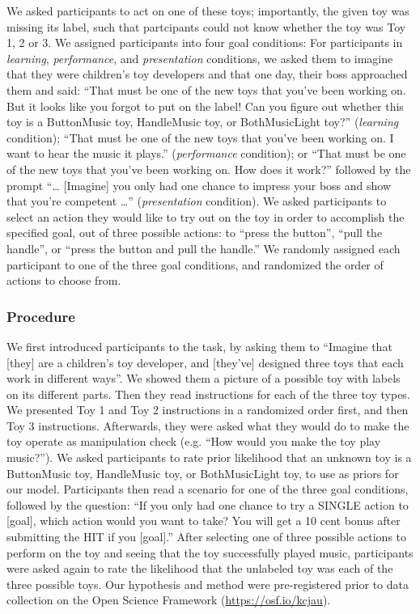 \documentclass[10pt, letterpaper]{article}
\begin{document}
We asked participants to act on one of these toys; importantly, the
given toy was missing its label, such that partcipants could not know
whether the toy was Toy 1, 2 or 3. We assigned participants into four
goal conditions: For participants in \emph{learning},
\emph{performance}, and \emph{presentation} conditions, we asked them to
imagine that they were children's toy developers and that one day, their
boss approached them and said: ``That must be one of the new toys that
you've been working on. But it looks like you forgot to put on the
label! Can you figure out whether this toy is a ButtonMusic toy,
HandleMusic toy, or BothMusicLight toy?'' (\emph{learning} condition);
``That must be one of the new toys that you've been working on. I want
to hear the music it plays.'' (\emph{performance} condition); or ``That
must be one of the new toys that you've been working on. How does it
work?'' followed by the prompt ``\ldots{} {[}Imagine{]} you only had one
chance to impress your boss and show that you're competent \ldots{}''
(\emph{presentation} condition). We asked participants to select an
action they would like to try out on the toy in order to accomplish the
specified goal, out of three possible actions: to ``press the button'',
``pull the handle'', or ``press the button and pull the handle.'' We
randomly assigned each participant to one of the three goal conditions,
and randomized the order of actions to choose from.

\subsubsection{Procedure}\label{procedure}

We first introduced participants to the task, by asking them to
``Imagine that {[}they{]} are a children's toy developer, and
{[}they've{]} designed three toys that each work in different ways''. We
showed them a picture of a possible toy with labels on its different
parts. Then they read instructions for each of the three toy types. We
presented Toy 1 and Toy 2 instructions in a randomized order first, and
then Toy 3 instructions. Afterwards, they were asked what they would do
to make the toy operate as manipulation check (e.g. ``How would you make
the toy play music?''). We asked participants to rate prior likelihood
that an unknown toy is a ButtonMusic toy, HandleMusic toy, or
BothMusicLight toy, to use as priors for our model. Participants then
read a scenario for one of the three goal conditions, followed by the
question: ``If you only had one chance to try a SINGLE action to
{[}goal{]}, which action would you want to take? You will get a 10 cent
bonus after submitting the HIT if you {[}goal{]}.'' After selecting one
of three possible actions to perform on the toy and seeing that the toy
successfully played music, participants were asked again to rate the
likelihood that the unlabeled toy was each of the three possible toys.
Our hypothesis and method were pre-registered prior to data collection
on the Open Science Framework (\url{https://osf.io/kcjau}).
\end{document}
